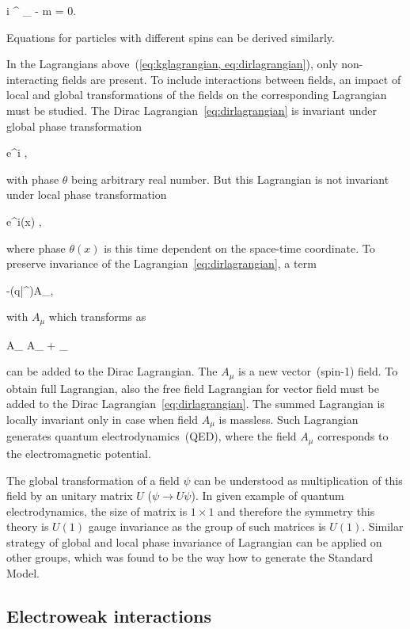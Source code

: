 {
  i \gamma^{\mu} \partial_{\mu} \psi - m \psi = 0.
}

Equations for particles with different spins can be derived similarly.

In the Lagrangians above~(\ref{eq:kglagrangian, eq:dirlagrangian}), only non-interacting fields are present. To include interactions between fields, an impact of local and global transformations of the fields on the corresponding Lagrangian must be studied. The Dirac Lagrangian~\ref{eq:dirlagrangian} is invariant under global phase transformation

{
\psi \to e^{i\theta} \psi, 
}

with phase $\theta$ being arbitrary real number. But this Lagrangian is not invariant under local phase transformation 

{
\psi \to e^{i\theta (x)} \psi,
}

where phase $\theta(x)$ is this time dependent on the space-time coordinate. To preserve invariance of the Lagrangian~\ref{eq:dirlagrangian}, a term 

{
-(q\bar{\psi}\gamma^{\mu}\psi)A_{\mu}, 
}

with $A_{\mu}$ which transforms as 

{
A_{\mu} \to A_{\mu} + \partial_{\mu} \lambda
}

can be added to the Dirac Lagrangian. The $A_{\mu}$ is a new vector~(spin-1) field. To obtain full Lagrangian, also the free field Lagrangian for vector field must be added to the Dirac Lagrangian~\ref{eq:dirlagrangian}. The summed Lagrangian is locally invariant only in case when field $A_{\mu}$ is massless. Such Lagrangian generates quantum electrodynamics~(QED), where the field $A_{\mu}$ corresponds to the electromagnetic potential.

The global transformation of a field $\psi$ can be understood as multiplication of this field by an unitary matrix $U$ ($\psi \to U \psi$). In given example of quantum electrodynamics, the size of matrix is $1 \times 1$ and therefore the symmetry this theory is $U(1)$ gauge invariance as the group of such matrices is $U(1)$. Similar strategy of global and local phase invariance of Lagrangian can be applied on other groups, which was found to be the way how to generate the Standard Model.

\subsection{Electroweak interactions}


